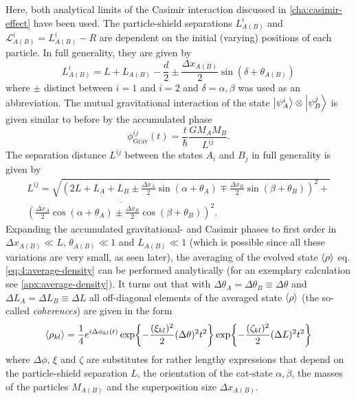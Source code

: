 Here, both analytical limits of the Casimir interaction discussed in \cref{cha:casimir-effect} have been used.
The particle-shield separations $L^i_{A(B)}$ and $\mathscr{L}^i_{A(B)} = L^i_{A(B)}-R$ are dependent on the initial (varying) positions of each particle.
In full generality, they are given by
\begin{equation}\label{eq:4:L-casimir}
  L^i_{A(B)} = L + L_{A(B)} - \frac{d}{2} \pm \frac{\Delta x_{A(B)}}{2} \sin(\delta + \theta_{A(B)})
\end{equation}
where $\pm$ distinct between $i=1$ and $i=2$ and $\delta = \alpha, \beta$ was used as an abbreviation.
The mutual gravitational interaction of the state $\ket{\psi^i_A}\otimes\ket{\psi^j_B}$ is given similar to before by the accumulated phase
\begin{equation}
  \phi^{ij}_\mathrm{Grav}(t) = \frac{t}{\hbar} \frac{G M_A M_B}{L^{ij}} .
\end{equation}
The separation distance $L^{ij}$ between the states $A_i$ and $B_j$ in full generality is given by
\begin{multline}\label{eq:4:L-gravity}
  L^{ij} = \sqrt{\left(2L + L_A + L_B \pm \frac{\Delta x_A}{2}\sin(\alpha + \theta_A) \mp \frac{\Delta x_B}{2}\sin(\beta + \theta_B)\right)^2 +} \\ \overline{\left(\frac{\Delta x_A}{2}\cos(\alpha + \theta_A) \pm \frac{\Delta x_B}{2}\cos(\beta + \theta_B)\right)^2} .
\end{multline}
Expanding the accumulated gravitational- and Casimir phases to first order in $\Delta x_{A(B)} \ll L$, $\theta_{A(B)} \ll 1$ and $L_{A(B)} \ll 1$ (which is possible since all these variations are very small, as seen later), the averaging of the evolved state $\left\langle\rho\right\rangle$ eq. \eqref{eq:4:average-density} can be performed analytically (for an exemplary calculation see \cref{apx:average-density}).
It turns out that with $\Delta \theta_A = \Delta \theta_B \equiv \Delta\theta$ and $\Delta L_A = \Delta L_B \equiv \Delta L$ all off-diagonal elements of the averaged state $\left\langle\rho\right\rangle$ (the so-called \emph{coherences}) are given in the form
\begin{equation}\label{eq:4:average-density-element}
  \left\langle\rho_{kl}\right\rangle = \frac{1}{4} e^{i \Delta \phi_{kl}(t)} \exp{-\frac{(\xi_{kl})^2}{2} (\Delta\theta)^2 t^2} \exp{-\frac{(\zeta_{kl})^2}{2} (\Delta L)^2 t^2}
\end{equation}
where $\Delta \phi$, $\xi$ and $\zeta$ are substitutes for rather lengthy expressions that depend on the particle-shield separation $L$, the orientation of the cat-state $\alpha, \beta$, the masses of the particles $M_{A(B)}$ and the superposition size $\Delta x_{A(B)}$.

